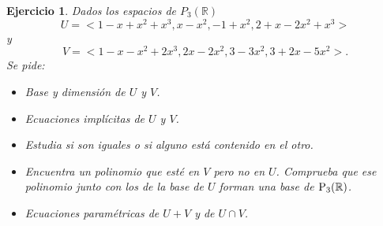\documentclass{amsart}
\newtheorem{ejer}{Ejercicio}
\def\r{\mathbb{R}}
\begin{document}
\begin{ejer} Dados los espacios de ${P}_3(\r )$
\[U = <1-x+x^2+x^3, x-x^2, -1+x^2, 2+x-2x^2+x^3> \] y 
\[V = <1-x-x^2+2x^3, 2x-2x^2, 3-3x^2, 3+2x-5x^2> .\] Se pide:
\begin{itemize}
\item[a)] Base y dimensi\'on de $U$ y $V$.
\item[b)] Ecuaciones impl\'{i}citas de $U$ y $V$.
\item[c)] Estudia si son iguales o si alguno est\'a contenido en el otro.
\item[d)] Encuentra un polinomio que est\'e en $V$ pero no en $U$. Comprueba que ese polinomio junto con los de la base de $U$ forman una base de $\hbox {P}_3(\r )$.
\item[e)] Ecuaciones param\'etricas de $U+V$ y de $U\cap V$. 

\end{itemize}


\end{ejer}
\end{document}
